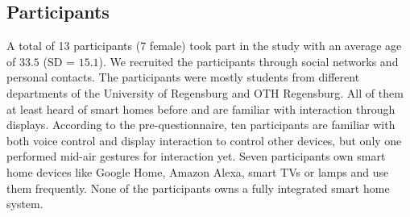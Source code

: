\documentclass[sigchi]{acmart}
\begin{document}
	\subsection{Participants}
	A total of 13 participants (7 female) took part in the study with an average age of $33.5$ (SD = $15.1$). We recruited the participants through social networks and personal contacts. The participants were mostly students from different departments of the University of Regensburg and OTH Regensburg. All of them at least heard of smart homes before and are familiar with interaction through displays. According to the pre-questionnaire, ten participants are familiar with both voice control and display interaction to control other devices, but only one performed mid-air gestures for interaction yet. Seven participants own smart home devices like Google Home, Amazon Alexa, smart TVs or lamps and use them frequently. None of the participants owns a fully integrated smart home system.
	
\end{document}
